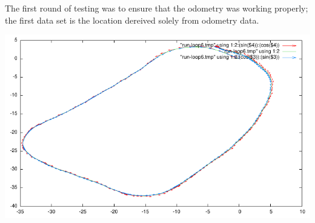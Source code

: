 The first round of testing was to ensure that the odometry was working properly; the first data set is the location dereived solely from odometry data.

\includegraphics{run-loop6}
